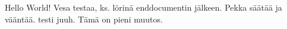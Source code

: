 \documentclass{article}
\begin{document}
Hello World!
Vesa testaa, ks. lörinä enddocumentin jälkeen.
Pekka säätää ja vääntää. testi
juuh.
Tämä on pieni muutos.
\end{document}
